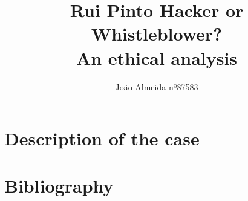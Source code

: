 \documentclass{article}
\title{Rui Pinto Hacker or Whistleblower? \\ An ethical analysis}
\author{João Almeida nº87583}
\begin{document}
\maketitle

\section{Description of the case}


\clearpage
\section{Bibliography}

\end{document}
